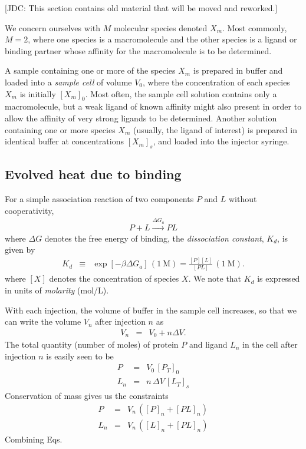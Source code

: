 \documentclass[aps,pre,twocolumn,nofootinbib,superscriptaddress,linenumbers]{revtex4-1}
\begin{document}
\color{red}
[JDC: This section contains old material that will be moved and reworked.]

We concern ourselves with $M$ molecular species denoted $X_m$.
Most commonly, $M = 2$, where one species is a macromolecule and the other species is a ligand or binding partner whose affinity for the macromolecule is to be determined.

A sample containing one or more of the species $X_m$ is prepared in buffer and loaded into a \emph{sample cell} of volume $V_0$, where the concentration of each species $X_m$ is initially $[X_m]_0$.
Most often, the sample cell solution contains only a macromolecule, but a weak ligand of known affinity might also present in order to allow the affinity of very strong ligands to be determined.
Another solution containing one or more species $X_m$ (usually, the ligand of interest) is prepared in identical buffer at concentrations $[X_m]_s$, and loaded into the injector syringe.


\subsection{Evolved heat due to binding}

For a simple association reaction of two components $P$ and $L$ without cooperativity,
\begin{eqnarray}
P + L \stackrel{\Delta G_a}{\rightarrow} PL \nonumber
\end{eqnarray}
where $\Delta G$ denotes the free energy of binding, the \emph{dissociation constant}, $K_d$, is given by
\begin{eqnarray}
K_d &\equiv& \exp[-\beta \Delta G_a] \, (1 \: \mathrm{M}) = \frac{[P] [L]}{[PL]} \, (1 \: \mathrm{M}) . \label{equation:two-component-binding-model}
\end{eqnarray}
where $[X]$ denotes the concentration of species $X$.
We note that $K_d$ is expressed in units of \emph{molarity} (mol/L).

With each injection, the volume of buffer in the sample cell increases, so that we can write the volume $V_n$ after injection $n$ as
\begin{eqnarray}
V_n &=& V_0 + n \Delta V .
\end{eqnarray}
The total quantity (number of moles) of protein $P$ and ligand $L_n$ in the cell after injection $n$ is easily seen to be
\begin{eqnarray}
P &=& V_0 \, [P_T]_0 \nonumber \\
L_n &=& n \, \Delta V \, [L_T]_s
\end{eqnarray}
Conservation of mass gives us the constraints
\begin{eqnarray}
P &=& V_n \, ([P]_n + [PL]_n) \nonumber \\
L_n &=& V_n \, ([L]_n + [PL]_n) \label{equation:conservation-of-mass}
\end{eqnarray}
Combining Eqs.
\end{document}
